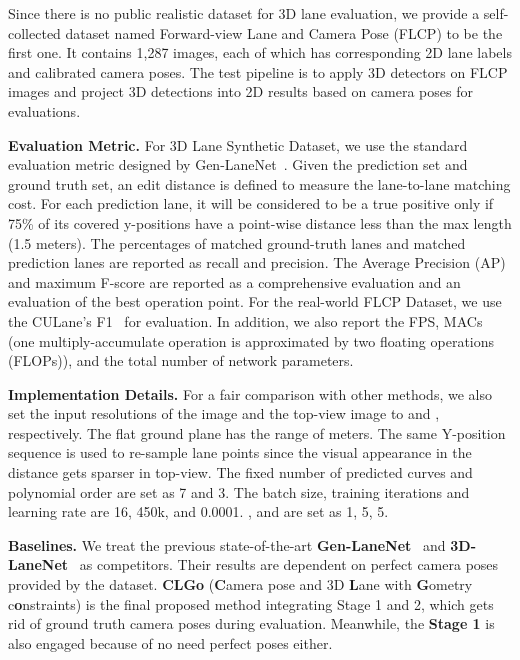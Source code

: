 \documentclass[letterpaper]{article} \usepackage{aaai22}  \usepackage{times}  \usepackage{helvet}  \usepackage{courier}  \usepackage[hyphens]{url}  \usepackage{graphicx} \urlstyle{rm} \def\UrlFont{\rm}  \usepackage{natbib}  \usepackage{caption}
\begin{document}
Since there is no public realistic dataset for 3D lane evaluation, we provide a self-collected dataset named Forward-view Lane and Camera Pose (FLCP) to be the first one. It contains 1,287 images, each of which has corresponding 2D lane labels and calibrated camera poses. The test pipeline is to apply 3D detectors on FLCP images and project 3D detections into 2D results based on camera poses for evaluations. 


\noindent \textbf{Evaluation Metric.}
For 3D Lane Synthetic Dataset, we use the standard evaluation metric designed by Gen-LaneNet~\cite{GenLaneNet}. Given the prediction set and ground truth set, an edit distance  is defined to measure the lane-to-lane matching cost. 
For each prediction lane, it will be considered to be a true positive only if 75\% of its covered y-positions have a point-wise distance less than the max length (1.5 meters). The percentages of matched ground-truth lanes and matched prediction lanes are reported as recall and precision. The Average Precision (AP) and maximum F-score are reported as a comprehensive evaluation and an evaluation of the best operation point. 
For the real-world FLCP Dataset, we use the CULane's F1~\cite{SCNN} for evaluation. In addition, we also report the FPS, MACs~\cite{MACs} (one multiply-accumulate operation is approximated by two floating operations (FLOPs)), and the total number of network parameters.


\noindent \textbf{Implementation Details.}
For a fair comparison with other methods, we also set the input resolutions of the image and the top-view image to  and , respectively. The flat ground plane has the range of  meters. The same Y-position sequence  is used to re-sample lane points since the visual appearance in the distance gets sparser in top-view. The fixed number of predicted curves  and polynomial order  are set as 7 and 3. 
The batch size, training iterations and learning rate are 16, 450k, and 0.0001.
,  and  are set as 1, 5, 5. 


\noindent \textbf{Baselines.}
We treat the previous state-of-the-art \textbf{Gen-LaneNet}~\cite{GenLaneNet} and \textbf{3D-LaneNet}~\cite{3DLaneNet} as competitors. Their results are dependent on perfect camera poses provided by the dataset. \textbf{CLGo} (\textbf{C}amera pose and 3D \textbf{L}ane with \textbf{G}ometry c\textbf{o}nstraints) is the final proposed method integrating Stage 1 and 2, which gets rid of ground truth camera poses during evaluation. Meanwhile, the \textbf{Stage 1} is also engaged because of no need perfect poses either.
\end{document}
